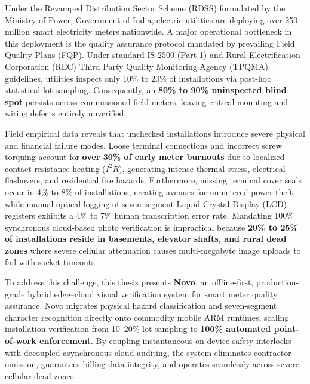 \documentclass[12pt,a4paper,oneside]{report}
\begin{document}
Under the Revamped Distribution Sector Scheme (RDSS) formulated by the Ministry of Power, Government of India, electric utilities are deploying over 250 million smart electricity meters nationwide. A major operational bottleneck in this deployment is the quality assurance protocol mandated by prevailing Field Quality Plans (FQP). Under standard IS 2500 (Part 1) and Rural Electrification Corporation (REC) Third Party Quality Monitoring Agency (TPQMA) guidelines, utilities inspect only 10\% to 20\% of installations via post-hoc statistical lot sampling. Consequently, an \textbf{80\% to 90\% uninspected blind spot} persists across commissioned field meters, leaving critical mounting and wiring defects entirely unverified.

Field empirical data reveals that unchecked installations introduce severe physical and financial failure modes. Loose terminal connections and incorrect screw torquing account for \textbf{over 30\% of early meter burnouts} due to localized contact-resistance heating ($I^2 R$), generating intense thermal stress, electrical flashovers, and residential fire hazards. Furthermore, missing terminal cover seals occur in 4\% to 8\% of installations, creating avenues for unmetered power theft, while manual optical logging of seven-segment Liquid Crystal Display (LCD) registers exhibits a 4\% to 7\% human transcription error rate. Mandating 100\% synchronous cloud-based photo verification is impractical because \textbf{20\% to 25\% of installations reside in basements, elevator shafts, and rural dead zones} where severe cellular attenuation causes multi-megabyte image uploads to fail with socket timeouts.

To address this challenge, this thesis presents \textbf{Novo}, an offline-first, production-grade hybrid edge--cloud visual verification system for smart meter quality assurance. Novo migrates physical hazard classification and seven-segment character recognition directly onto commodity mobile ARM runtimes, scaling installation verification from 10--20\% lot sampling to \textbf{100\% automated point-of-work enforcement}. By coupling instantaneous on-device safety interlocks with decoupled asynchronous cloud auditing, the system eliminates contractor omission, guarantees billing data integrity, and operates seamlessly across severe cellular dead zones.

\clearpage
\thispagestyle{plain}
\end{document}
